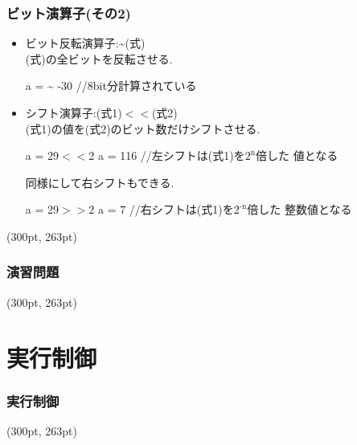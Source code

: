 \documentclass[dvipdfmx]{beamer}
\begin{document}
\begin{frame}[t, fragile, label=23]
    \frametitle{ビット演算子(その2)}
    \begin{itemize}
        \item ビット反転演算子:\~\space (式)\\
            \qquad (式)の全ビットを反転させる.
            \begin{block}{a = \~}
                -30 \qquad //8bit分計算されている
            \end{block}
        \item シフト演算子:(式1)$<<$(式2)\\
            \qquad (式1)の値を(式2)のビット数だけシフトさせる. 
            \begin{block}{a = 29$<<$2}
                a = 116 \qquad //左シフトは(式1)を$2^{\textrm{n}}$倍した
                値となる
            \end{block}
            \qquad 同様にして右シフトもできる.
            \begin{block}{a = 29$>>$2}
                a = 7 \qquad //右シフトは(式1)を$2^{\textrm{-n}}$倍した
                整数値となる
            \end{block}
    \end{itemize}
    \begin{textblock*}{0.3\linewidth}(300pt, 263pt)
    \hyperlink{22}{}
    \space
    \hyperlink{24}{}
    \end{textblock*}
\end{frame}

\begin{frame}[t,fragile, label=24]
    \frametitle{演習問題}
    \begin{textblock*}{0.3\linewidth}(300pt, 263pt)
    \hyperlink{23}{}
    \space
    \hyperlink{25}{}
    \end{textblock*}
\end{frame}

\section{実行制御}
\begin{frame}[label=25]
    \frametitle{実行制御}
    \tableofcontents[sections={2,7}]
    \begin{textblock*}{0.3\linewidth}(300pt, 263pt)
    \hyperlink{24}{}
    \space
    \hyperlink{26}{}
    \end{textblock*}
\end{frame}
\end{document}
